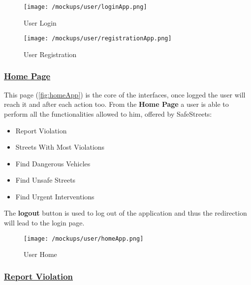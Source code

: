 			\vspace{0.6cm}
				
			\begin{figure}[ht!]
				\centering
				\begin{minipage}{0.5\textwidth}
					\centering
					\texttt{[image: /mockups/user/loginApp.png]}
					\caption{\label{fig:loginApp} User Login}
				\end{minipage}\hfill
				\begin{minipage}{0.5\textwidth}
					\centering
					\texttt{[image: /mockups/user/registrationApp.png]}
					\caption{\label{fig:registrationApp} User Registration}
				\end{minipage}
			\end{figure}
		
		\subsubsection[Home Page]{\hyperlink{toc}{Home Page}}
			\label{sec:userHomePage}
			
			This page (\autoref{fig:homeApp}) is the core of the interfaces, once logged the user will reach it and after each action too. From the \textbf{Home Page} a user is able to perform all the functionalities allowed to him, offered by SafeStreets:
			
			\begin{itemize}
				\item Report Violation
				\item Streets With Most Violations
				\item Find Dangerous Vehicles
				\item Find Unsafe Streets
				\item Find Urgent Interventions
			\end{itemize}
		
			The \textbf{logout} button is used to log out of the application and thus the redirection will lead to the login page.\\
			
			\begin{figure}[ht!]
				\centering
				\texttt{[image: /mockups/user/homeApp.png]}
				\caption{\label{fig:homeApp} User Home}
			\end{figure}

		\subsubsection[Report Violation]{\hyperlink{toc}{Report Violation}}
			\label{sec:userReportViolation}
			

